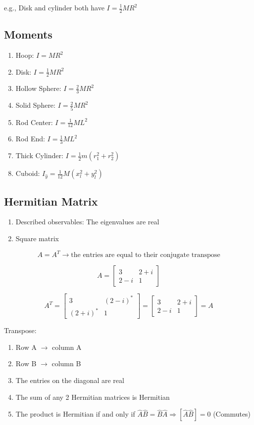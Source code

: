 \documentclass[10pt,letter]{article}
\begin{document}
e.g., Disk and cylinder both have $I=\frac{1}{2}MR^2$

\subsection{Moments}
\begin{enumerate}
    \item Hoop: $I=MR^2$
    \item Disk: $I=\frac{1}{2}MR^2$
    \item Hollow Sphere: $I = \frac{2}{3}MR^2$
    \item Solid Sphere: $I=\frac{2}{5}MR^2$
    \item Rod Center: $I=\frac{1}{12}ML^2$
    \item Rod End: $I=\frac{1}{3}ML^2$
    \item Thick Cylinder: $I=\frac{1}{2}m(r^2_1 + r^2_2)$
    \item Cuboid: $I_{\hat{y}} = \frac{1}{12}M(x^2_l + y^2_l)$
\end{enumerate}

\subsection{Hermitian Matrix}
\begin{enumerate}
    \item Described observables: The eigenvalues are real
    \item Square matrix
\end{enumerate}
\begin{equation}
 A = A^T \rightarrow \textrm{the entries are equal to their conjugate transpose}
\end{equation}

\[A= \left[ \begin{array}{cc}
3 & 2+i  \\
2-i & 1  \end{array} \right]\]

\[A^T= \left[ \begin{array}{cc}
3 & (2-i)^*  \\
(2+i)^* & 1  \end{array} \right] = 
\left[ \begin{array}{cc}
3 & 2+i  \\
2-i & 1  \end{array} \right] = A\]

Transpose: 
\begin{enumerate}
    \item Row A $\rightarrow$ column A
    \item Row B $\rightarrow$ column B
    \item The entries on the diagonal are real
    \item The sum of any 2 Hermitian matrices is Hermitian
    \item The product is Hermitian if and only if $\hat{A}\hat{B} = \hat{B}\hat{A}\Rightarrow [\hat{A}\hat{B}]=0$ (Commutes)
\end{enumerate}
\end{document}
